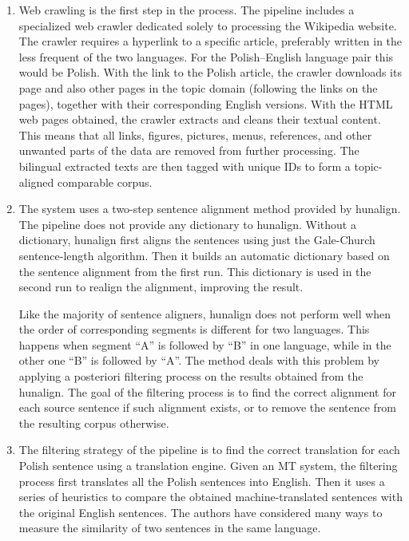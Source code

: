 \begin{enumerate}
	\item Web crawling is the first step in the process. The pipeline includes a specialized web crawler dedicated solely to processing the Wikipedia website. The crawler requires a hyperlink to a specific article, preferably written in the less frequent of the two languages. For the Polish--English language pair this would be Polish. With the link to the Polish article, the crawler downloads its page and also other pages in the topic domain (following the links on the pages), together with their corresponding English versions. With the HTML web pages obtained, the crawler extracts and cleans their textual content. This means that all links, figures, pictures, menus, references, and other unwanted parts of the data are removed from further processing. The bilingual extracted texts are then tagged with unique IDs to form a topic-aligned comparable corpus.
	
	\item The system uses a two-step sentence alignment method provided by hunalign. The pipeline does not provide any dictionary to hunalign. Without a dictionary, hunalign first aligns the sentences using just the Gale-Church~\cite{Gale93} sentence-length algorithm. Then it builds an automatic dictionary based on the sentence alignment from the first run. This dictionary is used in the second run to realign the alignment, improving the result.
	
	Like the majority of sentence aligners, hunalign does not perform well when the order of corresponding segments is different for two languages. This happens when segment ``A'' is followed by ``B'' in one language, while in the other one ``B'' is followed by ``A''. The method deals with this problem by applying a posteriori filtering process on the results obtained from the hunalign. The goal of the filtering process is to find the correct alignment for each source sentence if such alignment exists, or to remove the sentence from the resulting corpus otherwise.
	
	\item The filtering strategy of the pipeline is to find the correct translation for each Polish sentence using a translation engine. Given an MT system, the filtering process first translates all the Polish sentences into English. Then it uses a series of heuristics to compare the obtained machine-translated sentences with the original English sentences. The authors have considered many ways to measure the similarity of two sentences in the same language. 
	

\end{enumerate}
